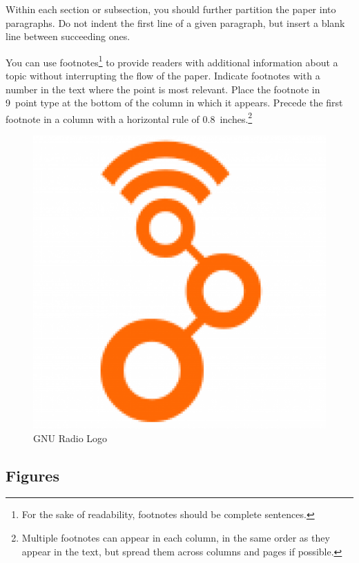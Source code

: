 \documentclass{article}
\begin{document}
Within each section or subsection, you should further partition the
paper into paragraphs. Do not indent the first line of a given
paragraph, but insert a blank line between succeeding ones.
 
You can use footnotes\footnote{For the sake of readability, footnotes
should be complete sentences.} to provide readers with additional
information about a topic without interrupting the flow of the paper. 
Indicate footnotes with a number in the text where the point is most
relevant. Place the footnote in 9~point type at the bottom of the
column in which it appears. Precede the first footnote in a column
with a horizontal rule of 0.8~inches.\footnote{Multiple footnotes can
appear in each column, in the same order as they appear in the text,
but spread them across columns and pages if possible.}

\begin{figure}[ht]
\vskip 0.2in
\begin{center}
\centerline{\includegraphics[width=\columnwidth]{gr.png}}
\caption{GNU Radio Logo}
\label{figure:gr-logo}
\end{center}
\vskip -0.2in
\end{figure} 

\subsection{Figures}
 
\end{document}
